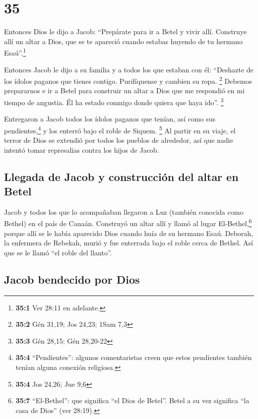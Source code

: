 \hypertarget{section-34}{%
\section{35}\label{section-34}}

 Entonces Dios le dijo a Jacob: ``Prepárate para ir a
Betel y vivir allí. Construye allí un altar a Dios, que se te apareció
cuando estabas huyendo de tu hermano Esaú''.\footnote{\textbf{35:1} Ver
  28:11 en adelante.}

 Entonces Jacob le dijo a su familia y a todos los que
estaban con él: ``Deshazte de los ídolos paganos que tienes contigo.
Purifíquense y cambien su ropa. \footnote{\textbf{35:2} Gén 31,19; Jos
  24,23; 1Sam 7,3}  Debemos prepararnos e ir a Betel para
construir un altar a Dios que me respondió en mi tiempo de angustia. Él
ha estado conmigo donde quiera que haya ido''. \footnote{\textbf{35:3}
  Gén 28,15; Gén 28,20-22}

 Entregaron a Jacob todos los ídolos paganos que tenían,
así como sus pendientes,\footnote{\textbf{35:4} ``Pendientes'': algunos
  comentaristas creen que estos pendientes también tenían alguna
  conexión religiosa.} y los enterró bajo el roble de Siquem.
\footnote{\textbf{35:4} Jos 24,26; Jue 9,6}  Al partir en
su viaje, el terror de Dios se extendió por todos los pueblos de
alrededor, así que nadie intentó tomar represalias contra los hijos de
Jacob.

\hypertarget{llegada-de-jacob-y-construcciuxf3n-del-altar-en-betel}{%
\subsection{Llegada de Jacob y construcción del altar en
Betel}\label{llegada-de-jacob-y-construcciuxf3n-del-altar-en-betel}}

 Jacob y todos los que lo acompañaban llegaron a Luz
(también conocida como Bethel) en el país de Canaán. 
Construyó un altar allí y llamó al lugar El-Bethel,\footnote{\textbf{35:7}
  ``El-Bethel'': que significa ``el Dios de Betel''. Betel a su vez
  significa ``la casa de Dios'' (ver 28:19).} porque allí se le había
aparecido Dios cuando huía de su hermano Esaú.  Deborah,
la enfermera de Rebekah, murió y fue enterrada bajo el roble cerca de
Bethel. Así que se le llamó ``el roble del llanto''.

\hypertarget{jacob-bendecido-por-dios}{%
\subsection{Jacob bendecido por Dios}\label{jacob-bendecido-por-dios}}

